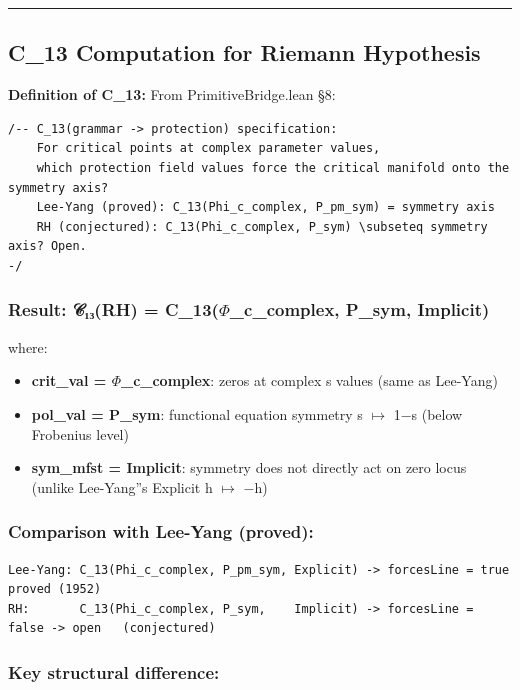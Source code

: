 \documentclass[12pt,a4paper]{article}
\newcommand{\pilcrow}{\S}
\begin{document}
\begin{center}
\rule{0.5\textwidth}{0.4pt}
\end{center}

\subsection{C\_13 Computation for Riemann Hypothesis}

\textbf{Definition of C\_13:}
From PrimitiveBridge.lean \pilcrow{}8:

\begin{lstlisting}[language=lean]
/-- C_13(grammar -> protection) specification:
    For critical points at complex parameter values,
    which protection field values force the critical manifold onto the symmetry axis?
    Lee-Yang (proved): C_13(Phi_c_complex, P_pm_sym) = symmetry axis
    RH (conjectured): C_13(Phi_c_complex, P_sym) \subseteq symmetry axis? Open.
-/
\end{lstlisting}

\subsubsection{\textbf{Result: 𝒞₁₃(RH) = C\_13($\Phi$\_c\_complex, P\_sym, Implicit)}}

where:

\begin{itemize}
    \item \textbf{crit\_val = $\Phi$\_c\_complex}: zeros at complex s values (same as Lee-Yang)
    \item \textbf{pol\_val = P\_sym}: functional equation symmetry s $\mapsto$ 1$-$s (below Frobenius level)
    \item \textbf{sym\_mfst = Implicit}: symmetry does not directly act on zero locus (unlike Lee-Yang''s Explicit h $\mapsto$ $-$h)
\end{itemize}

\subsubsection{Comparison with Lee-Yang (proved):}

\begin{lstlisting}
Lee-Yang: C_13(Phi_c_complex, P_pm_sym, Explicit) -> forcesLine = true   proved (1952)
RH:       C_13(Phi_c_complex, P_sym,    Implicit) -> forcesLine = false -> open   (conjectured)
\end{lstlisting}

\subsubsection{Key structural difference:}
\end{document}
